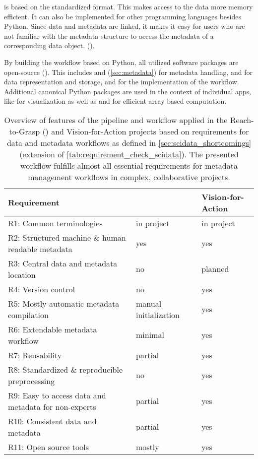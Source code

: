  is based on the standardized  format. This makes access to the data more memory efficient. It can also be implemented for other programming languages besides Python. Since data and metadata are linked, it makes it easy for users who are not familiar with the metadata structure to access the metadata of a corresponding data object. ().

By building the workflow based on Python, all utilized software packages are open-source (). This includes  and  (\cref{sec:metadata}) for metadata handling,  and  for data representation and storage, and  for the implementation of the workflow. Additional  canonical Python packages are used in the context of individual apps, like  for visualization as well as  and  for efficient array based computation.

\begin{table}[]
\footnotesize
\begin{tabular}{lll}
\hline
Requirement                                          &  \cite{Brochier_2018} & Vision-for-Action \\  \hline
R1: Common terminologies                             &  in project & in project \\ 
R2: Structured machine \& human readable metadata    &  yes & yes \\ 
R3: Central data and metadata location               &  no & planned \\ 
R4: Version control                                  &  no & yes \\ 
R5: Mostly automatic metadata compilation            &  manual initialization & yes \\ 
R6: Extendable metadata workflow                     &  minimal & yes \\ 
R7: Reusability                                      &  partial & yes \\ 
R8: Standardized \& reproducible preprocessing       &  no & yes \\ 
R9: Easy to access data and metadata for non-experts &  partial & yes \\ 
R10: Consistent data and metadata                    &  partial & yes \\ 
R11: Open source tools                               &  mostly & yes \\ \hline
\end{tabular}
\caption[Overview of workflow features for Vision-for-Action project]{Overview of features of the pipeline and workflow applied in the Reach-to-Grasp (\cite{Brochier_2018}) and Vision-for-Action projects based on requirements for data and metadata workflows as defined in \cref{sec:scidata_shortcomings} (extension of \cref{tab:requirement_check_scidata}). The presented workflow fulfills almost all essential requirements for metadata management workflows in complex, collaborative projects.}
\label{tab:requirement_check_v4a}
\end{table}


